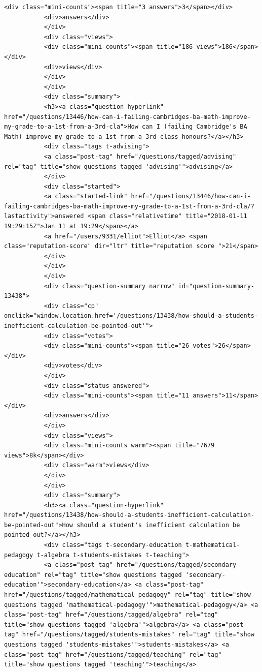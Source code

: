 \documentclass[11pt]{article}
\begin{document}
\begin{Verbatim}[commandchars=\\\{\}]
           <div class="mini-counts"><span title="3 answers">3</span></div>
           <div>answers</div>
           </div>
           <div class="views">
           <div class="mini-counts"><span title="186 views">186</span></div>
           <div>views</div>
           </div>
           </div>
           <div class="summary">
           <h3><a class="question-hyperlink" href="/questions/13446/how-can-i-failing-cambridges-ba-math-improve-my-grade-to-a-1st-from-a-3rd-cla">How can I (failing Cambridge's BA Math) improve my grade to a 1st from a 3rd-class honours?</a></h3>
           <div class="tags t-advising">
           <a class="post-tag" href="/questions/tagged/advising" rel="tag" title="show questions tagged 'advising'">advising</a>
           </div>
           <div class="started">
           <a class="started-link" href="/questions/13446/how-can-i-failing-cambridges-ba-math-improve-my-grade-to-a-1st-from-a-3rd-cla/?lastactivity">answered <span class="relativetime" title="2018-01-11 19:29:15Z">Jan 11 at 19:29</span></a>
           <a href="/users/9331/elliot">Elliot</a> <span class="reputation-score" dir="ltr" title="reputation score ">21</span>
           </div>
           </div>
           </div>
           <div class="question-summary narrow" id="question-summary-13438">
           <div class="cp" onclick="window.location.href='/questions/13438/how-should-a-students-inefficient-calculation-be-pointed-out'">
           <div class="votes">
           <div class="mini-counts"><span title="26 votes">26</span></div>
           <div>votes</div>
           </div>
           <div class="status answered">
           <div class="mini-counts"><span title="11 answers">11</span></div>
           <div>answers</div>
           </div>
           <div class="views">
           <div class="mini-counts warm"><span title="7679 views">8k</span></div>
           <div class="warm">views</div>
           </div>
           </div>
           <div class="summary">
           <h3><a class="question-hyperlink" href="/questions/13438/how-should-a-students-inefficient-calculation-be-pointed-out">How should a student's inefficient calculation be pointed out?</a></h3>
           <div class="tags t-secondary-education t-mathematical-pedagogy t-algebra t-students-mistakes t-teaching">
           <a class="post-tag" href="/questions/tagged/secondary-education" rel="tag" title="show questions tagged 'secondary-education'">secondary-education</a> <a class="post-tag" href="/questions/tagged/mathematical-pedagogy" rel="tag" title="show questions tagged 'mathematical-pedagogy'">mathematical-pedagogy</a> <a class="post-tag" href="/questions/tagged/algebra" rel="tag" title="show questions tagged 'algebra'">algebra</a> <a class="post-tag" href="/questions/tagged/students-mistakes" rel="tag" title="show questions tagged 'students-mistakes'">students-mistakes</a> <a class="post-tag" href="/questions/tagged/teaching" rel="tag" title="show questions tagged 'teaching'">teaching</a>

\end{Verbatim}
\end{document}
